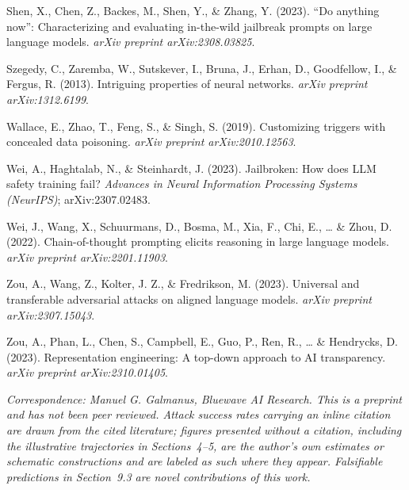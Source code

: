 \documentclass[
  11pt,
]{article}
\begin{document}
Shen, X., Chen, Z., Backes, M., Shen, Y., \& Zhang, Y. (2023). ``Do
anything now'': Characterizing and evaluating in-the-wild jailbreak
prompts on large language models. \emph{arXiv preprint arXiv:2308.03825}.

Szegedy, C., Zaremba, W., Sutskever, I., Bruna, J., Erhan, D.,
Goodfellow, I., \& Fergus, R. (2013). Intriguing properties of neural
networks. \emph{arXiv preprint arXiv:1312.6199}.

Wallace, E., Zhao, T., Feng, S., \& Singh, S. (2019). Customizing
triggers with concealed data poisoning. \emph{arXiv preprint
arXiv:2010.12563}.

Wei, A., Haghtalab, N., \& Steinhardt, J. (2023). Jailbroken: How does
LLM safety training fail? \emph{Advances in Neural Information Processing
Systems (NeurIPS)}; arXiv:2307.02483.

Wei, J., Wang, X., Schuurmans, D., Bosma, M., Xia, F., Chi, E., \ldots{}
\& Zhou, D. (2022). Chain-of-thought prompting elicits reasoning in
large language models. \emph{arXiv preprint arXiv:2201.11903}.

Zou, A., Wang, Z., Kolter, J. Z., \& Fredrikson, M. (2023). Universal
and transferable adversarial attacks on aligned language models.
\emph{arXiv preprint arXiv:2307.15043}.

Zou, A., Phan, L., Chen, S., Campbell, E., Guo, P., Ren, R., \ldots{} \&
Hendrycks, D. (2023). Representation engineering: A top-down approach to
AI transparency. \emph{arXiv preprint arXiv:2310.01405}.

\emph{Correspondence: Manuel G. Galmanus, Bluewave AI Research. This is
a preprint and has not been peer reviewed. Attack success rates carrying
an inline citation are drawn from the cited literature; figures presented
without a citation, including the illustrative trajectories in
Sections~4--5, are the author's own estimates or schematic constructions
and are labeled as such where they appear. Falsifiable predictions in
Section~9.3 are novel contributions of this work.}
\end{document}
